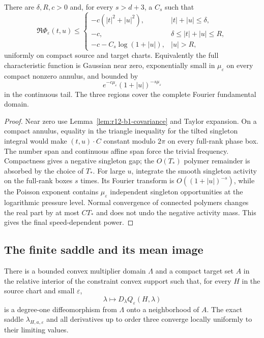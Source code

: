 \begin{theorem}
\label{thm:r12-b1-frequency}
There are $\delta,R,c>0$ and, for every $s>d+3$, a $C_s$ such that
\[
 \Re\Phi_\varepsilon(t,u)\le
 \begin{cases}
  -c(|t|^2+|u|^2),& |t|+|u|\le\delta,\\
  -c,& \delta\le |t|+|u|\le R,\\
  -c-C_s\log(1+|u|),& |u|>R,
 \end{cases}
\]
uniformly on compact source and target charts.  Equivalently the full
characteristic function is Gaussian near zero, exponentially small in
$\mu_\varepsilon$ on every compact nonzero annulus, and bounded by
\[
 e^{-c\mu_\varepsilon}(1+|u|)^{-s\mu_\varepsilon}
\]
in the continuous tail.  The three regions cover the complete Fourier
fundamental domain.
\end{theorem}

\begin{proof}
Near zero use Lemma~\ref{lem:r12-b1-covariance} and Taylor expansion.  On a
compact annulus, equality in the triangle inequality for the tilted singleton
integral would make $(t,u)\cdot C$ constant modulo $2\pi$ on every full-rank
phase box.  The number span and continuous affine span force the trivial
frequency.  Compactness gives a negative singleton gap; the $O(T_*)$ polymer
remainder is absorbed by the choice of $T_*$.  For large $u$, integrate the
smooth singleton activity on the full-rank boxes $s$ times.  Its Fourier
transform is $O((1+|u|)^{-s})$, while the Poisson exponent contains
$\mu_\varepsilon$ independent singleton opportunities at the logarithmic
pressure level.  Normal convergence of connected polymers changes the real
part by at most $CT_*$ and does not undo the negative activity mass.  This
gives the final speed-dependent power.
\end{proof}

\subsection{The finite saddle and its mean image}

\begin{theorem}
\label{thm:r12-b1-meanmap}
There is a bounded convex multiplier domain $\Lambda$ and a compact target
set $A$ in the relative interior of the constraint convex support such that,
for every $H$ in the source chart and small $\varepsilon$,
\[
 \lambda\mapsto D_\lambda Q_\varepsilon(H,\lambda)
\]
is a degree-one diffeomorphism from $\Lambda$ onto a neighborhood of $A$.
The exact saddle $\lambda_{H,a,\varepsilon}$ and all derivatives up to order
three converge locally uniformly to their limiting values.
\end{theorem}

